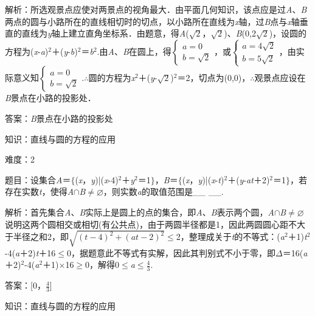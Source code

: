 \documentclass{article} %
\begin{document}
解析：所选观景点应使对两景点的视角最大．由平面几何知识，该点应是过\textit{A}、\textit{B}两点的圆与小路所在的直线相切时的切点，以小路所在直线为\textit{x}轴，过\textit{B}点与\textit{x}轴垂直的直线为\textit{y}轴上建立直角坐标系．由题意，得\textit{A}($\sqrt{2}$，$\sqrt{2}$)、\textit{B}(0,2$\sqrt{2}$)，设圆的方程为(\textit{x}-\textit{a})${}^{2}$＋(\textit{y}-\textit{b})${}^{2}$＝\textit{b}${}^{2}$.由\textit{A}、\textit{B}在圆上，得$\left\{\begin{array}{r} a=0\\ b=\sqrt{2} \end{array} \right.$，或$\left\{\begin{array}{r} a=4\sqrt{2}\\ b=5\sqrt{2} \end{array} \right.$，由实际意义知$\left\{\begin{array}{r} a=0\\ b=\sqrt{2} \end{array} \right.$.$\mathrm{\therefore}$圆的方程为\textit{x}${}^{2}$＋(\textit{y}-$\sqrt{2}$)${}^{2}$＝2，切点为(0,0)，$\mathrm{\therefore}$观景点应设在\textit{B}景点在小路的投影处．

答案：\textit{B}景点在小路的投影处

知识：直线与圆的方程的应用

难度：2

题目：设集合\textit{A}＝$\mathrm{\{}$(\textit{x}，\textit{y})|(\textit{x}-4)${}^{2}$＋\textit{y}${}^{2}$＝1$\mathrm{\}}$，\textit{B}＝$\mathrm{\{}$(\textit{x}，\textit{y})|(\textit{x}-\textit{t})${}^{2}$＋(\textit{y}-\textit{at}＋2)${}^{2}$＝1$\mathrm{\}}$，若存在实数\textit{t}，使得\textit{A}$\mathrm{\cap}$\textit{B}$\mathrm{\neq}$$\mathrm{\varnothing}$，则实数\textit{a}的取值范围是\_\_ \_\_.

解析：首先集合\textit{A}、\textit{B}实际上是圆上的点的集合，即\textit{A}、\textit{B}表示两个圆，\textit{A}$\mathrm{\cap}$\textit{B}$\mathrm{\neq}$$\mathrm{\varnothing}$说明这两个圆相交或相切(有公共点)，由于两圆半径都是1，因此两圆圆心距不大于半径之和2，即$\sqrt{(t-4)^2+(at-2)^2}$$\mathrm{\le}$2，整理成关于\textit{t}的不等式：(\textit{a}${}^{2}$＋1)\textit{t}${}^{2}$-4(\textit{a}＋2)\textit{t}＋16$\mathrm{\le}$0，据题意此不等式有实解，因此其判别式不小于零，即\textit{$\mathit{\Delta}$}＝16(\textit{a}＋2)${}^{2}$-4(\textit{a}${}^{2}$＋1)$\mathrm{\times}$16$\mathrm{\ge}$0，解得0$\mathrm{\le}$\textit{a}$\mathrm{\le}\frac{4}{3}$.

答案：[0，$\frac{4}{3}$]

知识：直线与圆的方程的应用
\end{document}
